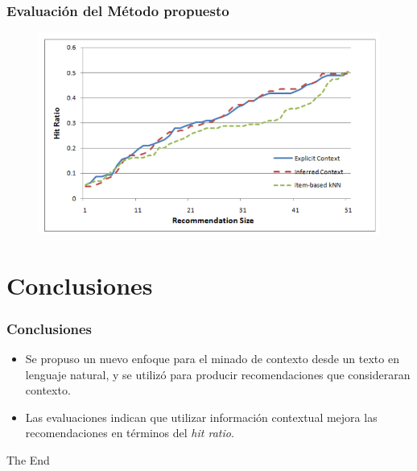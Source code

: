 \documentclass{beamer}
\begin{document}
\begin{frame}
\frametitle{Evaluación del Método propuesto}

\begin{figure}
\includegraphics[width=0.7\linewidth]{evaluation.png}
\end{figure}

\end{frame}


\section{Conclusiones}
\begin{frame}
\frametitle{Conclusiones}

\begin{itemize}
\item Se propuso un nuevo enfoque para el minado de contexto desde un texto en lenguaje natural, y se utilizó para producir recomendaciones que consideraran contexto.
\item Las evaluaciones indican que utilizar información contextual mejora las recomendaciones en términos del {\em hit ratio}.
\end{itemize}

\end{frame}


\begin{frame}
\Huge{\centerline{The End}}
\end{frame}

\end{document}

